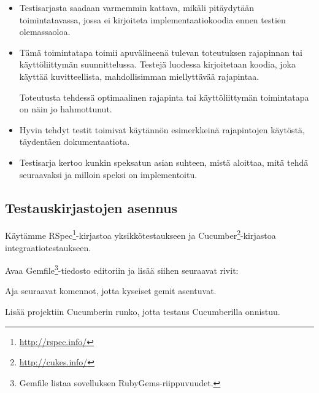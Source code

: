 \documentclass{article}
\begin{document}
\begin{itemize}
\item
Testisarjasta saadaan varmemmin kattava, mikäli pitäydytään toimintatavassa,
jossa ei kirjoiteta implementaatiokoodia ennen testien olemassaoloa.

\item
Tämä toimintatapa toimii apuvälineenä tulevan toteutuksen rajapinnan tai
käyttöliittymän suunnittelussa. Testejä luodessa kirjoitetaan koodia, joka
käyttää kuvitteellista, mahdollisimman miellyttävää rajapintaa.

Toteutusta tehdessä optimaalinen rajapinta tai käyttöliittymän toimintatapa on
näin jo hahmottunut.

\item
Hyvin tehdyt testit toimivat käytännön esimerkkeinä rajapintojen käytöstä,
täydentäen dokumentaatiota.

\item
Testisarja kertoo kunkin speksatun asian suhteen, mistä aloittaa, mitä tehdä
seuraavaksi ja milloin speksi on implementoitu.
\end{itemize}

\subsection{Testauskirjastojen asennus}

Käytämme RSpec\footnote{\url{http://rspec.info/}}-kirjastoa yksikkötestaukseen
ja Cucumber\footnote{\url{http://cukes.info/}}-kirjastoa
integraatiotestaukseen.

\begin{samepage}
Avaa Gemfile\footnote{Gemfile listaa sovelluksen
RubyGems-riippuvuudet.}-tiedosto editoriin ja lisää siihen seuraavat rivit:

\end{samepage}

\begin{samepage}
Aja seuraavat komennot, jotta kyseiset gemit asentuvat.

\end{samepage}

\begin{samepage}
Lisää projektiin Cucumberin runko, jotta testaus Cucumberilla onnistuu.

\end{samepage}
\end{document}
